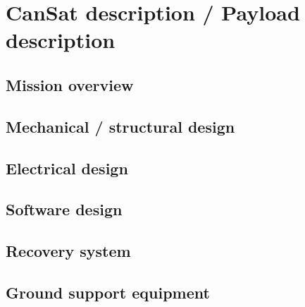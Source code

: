 \documentclass[11pt]{article}
\begin{document}
\section{CanSat description / Payload description}

\subsection{Mission overview}

\subsection{Mechanical / structural design}

\subsection{Electrical design}

\subsection{Software design}

\subsection{Recovery system}

\subsection{Ground support equipment}


\end{document}
